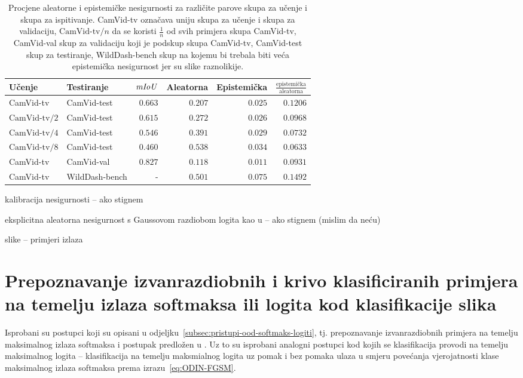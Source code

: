 \documentclass[utf8, diplomski, lmodern]{fer}
\begin{document}
\begin{table}
	\centering\small
	\begin{tabular}{llrrrr}
		\toprule
		\bfseries Učenje & \bfseries Testiranje & $\mathit{mIoU}$ & \bfseries Aleatorna & \bfseries Epistemička & $\frac{\text{epistemička}}{\text{aleatorna}}$ \\
		\midrule
		CamVid-tv & CamVid-test & $0.663$ & $0.207$ & $0.025$ & $0.1206$ \\
		$\text{CamVid-tv}/2$ & CamVid-test & $0.615$ & $0.272$ & $0.026$ & $0.0968$ \\
		$\text{CamVid-tv}/4$ & CamVid-test & $0.546$ & $0.391$ & $0.029$ & $0.0732$ \\
		$\text{CamVid-tv}/8$ & CamVid-test & $0.460$ & $0.538$ & $0.034$ & $0.0633$ \\
		\midrule
		CamVid-tv     & CamVid-val  & $0.827$ & $0.118$ & $0.011$ & $0.0931$ \\
		\midrule
		CamVid-tv  & WildDash-bench &      -  & $0.501$ & $0.075$ & $0.1492$ \\
		\bottomrule
	\end{tabular}
	\caption{Procjene aleatorne i epistemičke nesigurnosti za različite parove skupa za učenje i skupa za ispitivanje. CamVid-tv označava uniju skupa za učenje i skupa za validaciju, $\text{CamVid-tv}/n$ da se koristi $\frac{1}{n}$ od svih primjera skupa CamVid-tv, CamVid-val skup za validaciju koji je podskup skupa CamVid-tv, CamVid-test skup za testiranje, WildDash-bench skup na kojemu bi trebala biti veća epistemička nesigurnost jer su slike raznolikije.}
	\label{tab:epistemicka-aleatorna-ucenje-testiranje}
\end{table}


kalibracija nesigurnosti -- ako stignem

eksplicitna aleatorna nesigurnost s Gaussovom razdiobom logita kao u \cite{Kendall:2017:WUNBDLCV} -- ako stignem (mislim da neću)

slike -- primjeri izlaza

\section{Prepoznavanje izvanrazdiobnih i krivo klasificiranih primjera na temelju izlaza softmaksa ili logita kod klasifikacije slika}

Isprobani su postupci koji su opisani u odjeljku~\ref{subsec:pristupi-ood-softmaks-logiti}, tj. prepoznavanje izvanrazdiobnih primjera na temelju maksimalnog izlaza softmaksa \citep{Hendrycks:2016:BDMOODE} i postupak predložen u \cite{Liang:2017:PDOODENN}. Uz to su isprobani analogni postupci kod kojih se klasifikacija provodi na temelju maksimalnog logita -- klasifikacija na temelju maksmialnog logita uz pomak i bez pomaka ulaza u smjeru povećanja vjerojatnosti klase maksimalnog izlaza softmaksa prema izrazu~\eqref{eq:ODIN-FGSM}.
\end{document}
